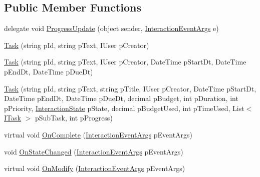 \subsection*{Public Member Functions}
\begin{DoxyCompactItemize}
\item 
delegate void \hyperlink{class_plex_byte_1_1_mo_cap_1_1_interactions_1_1_task_a7a8fb4764f97d4221d9c01f36737350e}{Progress\+Update} (object sender, \hyperlink{class_plex_byte_1_1_mo_cap_1_1_interactions_1_1_interaction_event_args}{Interaction\+Event\+Args} e)
\item 
\hyperlink{class_plex_byte_1_1_mo_cap_1_1_interactions_1_1_task_a57a0376ee5adf1aa90a555a5e3e1a90e}{Task} (string p\+Id, string p\+Text, I\+User p\+Creator)
\item 
\hyperlink{class_plex_byte_1_1_mo_cap_1_1_interactions_1_1_task_ad7b0d80dfd8588bcae2b8b90404b279f}{Task} (string p\+Id, string p\+Text, I\+User p\+Creator, Date\+Time p\+Start\+Dt, Date\+Time p\+End\+Dt, Date\+Time p\+Due\+Dt)
\item 
\hyperlink{class_plex_byte_1_1_mo_cap_1_1_interactions_1_1_task_a7646af76da19c1b8f96d216ae76f6ed8}{Task} (string p\+Id, string p\+Text, string p\+Title, I\+User p\+Creator, Date\+Time p\+Start\+Dt, Date\+Time p\+End\+Dt, Date\+Time p\+Due\+Dt, decimal p\+Budget, int p\+Duration, int p\+Priority, \hyperlink{namespace_plex_byte_1_1_mo_cap_1_1_interactions_afcb673d9186608b6bd3b187179aedc8a}{Interaction\+State} p\+State, decimal p\+Budget\+Used, int p\+Time\+Used, List$<$ \hyperlink{interface_plex_byte_1_1_mo_cap_1_1_interactions_1_1_i_task}{I\+Task} $>$ p\+Sub\+Task, int p\+Progress)
\item 
virtual void \hyperlink{class_plex_byte_1_1_mo_cap_1_1_interactions_1_1_task_ab74ee9d89534254215ae13eb91e12227}{On\+Complete} (\hyperlink{class_plex_byte_1_1_mo_cap_1_1_interactions_1_1_interaction_event_args}{Interaction\+Event\+Args} p\+Event\+Args)
\item 
void \hyperlink{class_plex_byte_1_1_mo_cap_1_1_interactions_1_1_task_a94296d62be4af091fd6a5e9a8a0fde8a}{On\+State\+Changed} (\hyperlink{class_plex_byte_1_1_mo_cap_1_1_interactions_1_1_interaction_event_args}{Interaction\+Event\+Args} p\+Event\+Args)
\item 
virtual void \hyperlink{class_plex_byte_1_1_mo_cap_1_1_interactions_1_1_task_ae9e732dc2f41a35a77dd8e143c8cf9c7}{On\+Modify} (\hyperlink{class_plex_byte_1_1_mo_cap_1_1_interactions_1_1_interaction_event_args}{Interaction\+Event\+Args} p\+Event\+Args)
\item 

\end{DoxyCompactItemize}
